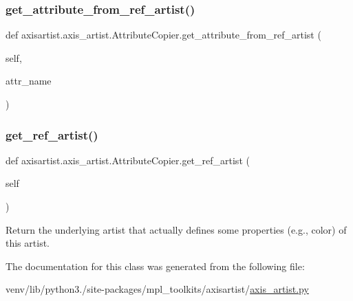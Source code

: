 \subsubsection{\texorpdfstring{get\+\_\+attribute\+\_\+from\+\_\+ref\+\_\+artist()}{get\_attribute\_from\_ref\_artist()}}
{\footnotesize\ttfamily def axisartist.\+axis\+\_\+artist.\+Attribute\+Copier.\+get\+\_\+attribute\+\_\+from\+\_\+ref\+\_\+artist (\begin{DoxyParamCaption}\item[{}]{self,  }\item[{}]{attr\+\_\+name }\end{DoxyParamCaption})}

\mbox{\label{classaxisartist_1_1axis__artist_1_1AttributeCopier_a8bb9b221e308625f12c318fe31955485}} 
\subsubsection{\texorpdfstring{get\+\_\+ref\+\_\+artist()}{get\_ref\_artist()}}
{\footnotesize\ttfamily def axisartist.\+axis\+\_\+artist.\+Attribute\+Copier.\+get\+\_\+ref\+\_\+artist (\begin{DoxyParamCaption}\item[{}]{self }\end{DoxyParamCaption})}

\begin{DoxyVerb}Return the underlying artist that actually defines some properties
(e.g., color) of this artist.
\end{DoxyVerb}
 

The documentation for this class was generated from the following file\+:\begin{DoxyCompactItemize}
\item 
venv/lib/python3./site-\/packages/mpl\+\_\+toolkits/axisartist/\hyperlink{axisartist_2axis__artist_8py}{axis\+\_\+artist.\+py}\end{DoxyCompactItemize}
